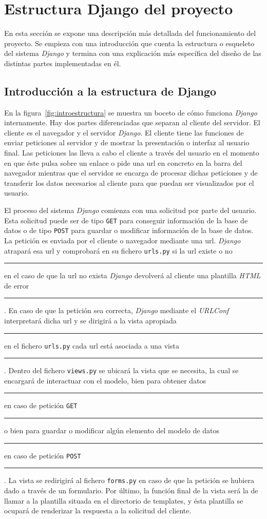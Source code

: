 \documentclass[a4paper, 12pt]{book}
\begin{document}
\section{Estructura Django del proyecto} 
\label{sec:estructuradjango}
En esta secci\'on se expone una descripci\'on m\'as detallada del funcionamiento del proyecto. Se empieza con una introducci\'on que cuenta la estructura
o esqueleto del sistema \textit{Django} y termina con una explicaci\'on m\'as espec\'ifica del dise\~no de las distintas partes implementadas en \'el.


\subsection{Introducci\'on a la estructura de Django} 
\label{sec:introestructura}
En la figura~\ref{fig:introestructura} se muestra un boceto de c\'omo funciona \textit{Django} internamente. Hay dos partes diferenciadas que separan al
cliente del servidor. El cliente es el navegador y el servidor \textit{Django}. El cliente tiene las funciones de enviar peticiones al servidor y de 
mostrar la presentaci\'on o interfaz al usuario final. Las peticiones las lleva a cabo el cliente a trav\'es del usuario en el momento en que \'este 
pulsa sobre un enlace o pide una url en concreto en la barra del navegador mientras que el servidor se encarga de procesar dichas peticiones y de 
transferir los datos necesarios al cliente para que puedan ser visualizados por el usuario.

El proceso del sistema \textit{Django} comienza con una solicitud por parte del usuario. Esta solicitud puede ser de tipo \texttt{GET} para conseguir 
informaci\'on de la base de datos o de tipo \texttt{POST} para guardar o modificar informaci\'on de la base de datos. La petici\'on es enviada por el 
cliente o navegador mediante una url. \textit{Django} atrapar\'a esa url y comprobar\'a en su fichero \texttt{urls.py} si la url existe o no 
\rule[1mm]{4mm}{0.1mm}en el caso de que la url no exista \textit{Django} devolver\'a al cliente una plantilla \textit{HTML} de error\rule[1mm]{4mm}{0.1mm}.
En caso de que la petici\'on sea correcta, \textit{Django} mediante el \textit{URLConf} interpretar\'a dicha url y se dirigir\'a a la vista apropiada 
\rule[1mm]{4mm}{0.1mm}en el fichero \texttt{urls.py} cada url est\'a asociada a una vista\rule[1mm]{4mm}{0.1mm}. Dentro del fichero \texttt{views.py} se
ubicar\'a la vista que se necesita, la cual se encargar\'a de interactuar con el modelo, bien para obtener datos \rule[1mm]{4mm}{0.1mm}en caso de 
petici\'on \texttt{GET}\rule[1mm]{4mm}{0.1mm} o bien para guardar o modificar alg\'un elemento del modelo de datos \rule[1mm]{4mm}{0.1mm}en caso de 
petici\'on \texttt{POST}\rule[1mm]{4mm}{0.1mm}. La vista se redirigir\'a al fichero \texttt{forms.py} en caso de que la petici\'on se hubiera dado a trav\'es
de un formulario. Por \'ultimo, la funci\'on final de la vista ser\'a la de llamar a la plantilla situada en el directorio de templates, y \'esta plantilla
se ocupar\'a de renderizar la respuesta a la solicitud del cliente.
\end{document}
